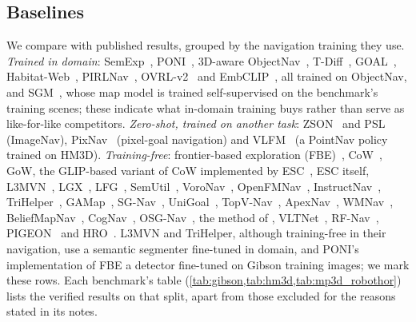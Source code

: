 \documentclass[10pt]{article}
\begin{document}
\subsection{Baselines}\label{sec:experiments-baselines}

We compare with published results, grouped by the navigation training they use. \emph{Trained in domain}:
SemExp~\citep{chaplot2020object}, PONI~\citep{ramakrishnan2022poni}, 3D-aware ObjectNav~\citep{zhang20233d},
T-Diff~\citep{yu2024trajectory}, GOAL~\citep{li2025goal}, Habitat-Web~\citep{ramrakhya2022habitat}, PIRLNav~\citep{ramrakhya2023pirlnav},
OVRL-v2~\citep{yadav2023ovrl} and EmbCLIP~\citep{khandelwal2022simple}, all trained on ObjectNav, and
SGM~\citep{zhang2024imagine}, whose map model is trained self-supervised on the benchmark's training scenes; these
indicate what in-domain training buys rather than serve as like-for-like competitors. \emph{Zero-shot, trained on
another task}: ZSON~\citep{majumdar2022zson} and PSL~\citep{sun2024prioritized} (ImageNav),
PixNav~\citep{cai2024bridging} (pixel-goal navigation) and VLFM~\citep{yokoyama2024vlfm} (a PointNav policy trained on
HM3D). \emph{Training-free}: frontier-based exploration (FBE)~\citep{yamauchi1997frontier}, CoW~\citep{gadre2023cows},
GoW, the GLIP-based variant of CoW implemented by ESC~\citep{zhou2023esc}, ESC itself, L3MVN~\citep{yu2023l3mvn}, LGX~\citep{dorbala2024can}, LFG~\citep{shah2023navigation},
SemUtil~\citep{chen2023how}, VoroNav~\citep{wu2024voronav}, OpenFMNav~\citep{kuang2024openfmnav},
InstructNav~\citep{long2024instructnav}, TriHelper~\citep{zhang2024trihelper}, GAMap~\citep{yuan2024gamap},
SG-Nav~\citep{yin2024sg}, UniGoal~\citep{yin2025unigoal}, TopV-Nav~\citep{zhong2024topvnav},
ApexNav~\citep{zhang2025apexnav}, WMNav~\citep{nie2025wmnav}, BeliefMapNav~\citep{zhou2025beliefmapnav},
CogNav~\citep{cao2025cognav}, OSG-Nav~\citep{loo2025open}, the method of \citet{unlu2024reproducibility}, VLTNet~\citep{vltnet2024},
RF-Nav~\citep{yuan2024defa}, PIGEON~\citep{peng2025pigeon} and HRO~\citep{jia2026hro}. L3MVN and TriHelper, although training-free in their navigation, use a
semantic segmenter fine-tuned in domain, and PONI's implementation of FBE a detector fine-tuned on Gibson training
images; we mark these rows. Each benchmark's table (\cref{tab:gibson,tab:hm3d,tab:mp3d_robothor}) lists the verified
results on that split, apart from those excluded for the reasons stated in its notes.
\end{document}
